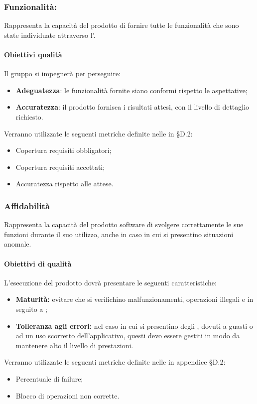 \documentclass[PianoDiQualifica.tex]{subfiles}
\begin{document}
\subsubsection{Funzionalità:} Rappresenta la capacità del prodotto di fornire tutte le funzionalità che sono state individuate attraverso l'\adr.	
\paragraph{Obiettivi qualità}
Il gruppo \gruppo si impegnerà per perseguire:
\begin{itemize}
	\item \textbf{Adeguatezza}: le funzionalità fornite siano conformi rispetto le aspettative;
	\item \textbf{Accuratezza}: il prodotto fornisca i risultati attesi, con il livello di dettaglio richiesto. 
\end{itemize}
Verranno utilizzate le seguenti metriche definite nelle \ndp in \S{D.2}:
\begin{itemize}
	\item {} Copertura requisiti obbligatori;
	\item {} Copertura requisiti accettati;
	\item {} Accuratezza rispetto alle attese.
\end{itemize}

\subsubsection{Affidabilità}
Rappresenta la capacità del prodotto software di svolgere correttamente le sue funzioni durante il suo utilizzo, anche in caso in cui si presentino situazioni anomale.
\paragraph{Obiettivi di qualità}
L'esecuzione del prodotto dovrà presentare le seguenti caratteristiche:
\begin{itemize}
	\item \textbf{Maturità:} evitare che si verifichino malfunzionamenti, operazioni illegali e  in seguito a ;
	\item \textbf{Tolleranza agli errori:} nel caso in cui si presentino degli , dovuti a guasti o ad un uso scorretto dell'applicativo, questi devo essere gestiti in modo da mantenere alto il livello di prestazioni.
\end{itemize}
Verranno utilizzate le seguenti metriche definite nelle \ndp in appendice \S{D.2}: 
\begin{itemize}
	\item {} Percentuale di failure;
	\item {} Blocco di operazioni non corrette.
\end{itemize}
\end{document}
